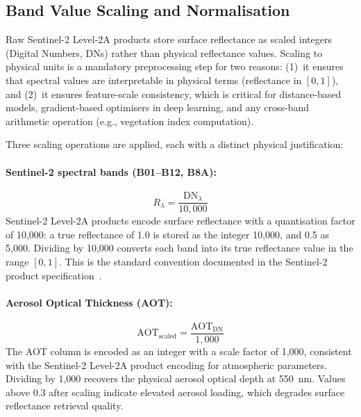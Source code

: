 \subsection{Band Value Scaling and Normalisation}
\label{subsec:scaling}

Raw Sentinel-2 Level-2A products store surface reflectance as scaled
integers (Digital Numbers, DNs) rather than physical reflectance values.
Scaling to physical units is a mandatory preprocessing step for two
reasons: (1)~it ensures that spectral values are interpretable in physical
terms (reflectance in $[0,1]$), and (2)~it ensures feature-scale
consistency, which is critical for distance-based models, gradient-based
optimisers in deep learning, and any cross-band arithmetic operation
(e.g., vegetation index computation).

Three scaling operations are applied, each with a distinct physical
justification:

\paragraph{Sentinel-2 spectral bands (B01--B12, B8A):}
\begin{equation}
\label{eq:band_scale}
R_{\lambda} = \frac{\mathrm{DN}_{\lambda}}{10{,}000}
\end{equation}
Sentinel-2 Level-2A products encode surface reflectance with a
quantisation factor of 10{,}000: a true reflectance of 1.0 is stored as
the integer 10{,}000, and 0.5 as 5{,}000. Dividing by 10{,}000 converts
each band into its true reflectance value in the range $[0,1]$. This is
the standard convention documented in the Sentinel-2 product
specification~\cite{esa2021s2}.

\paragraph{Aerosol Optical Thickness (AOT):}
\begin{equation}
\label{eq:aot_scale}
\mathrm{AOT}_{\text{scaled}} = \frac{\mathrm{AOT}_{\text{DN}}}{1{,}000}
\end{equation}
The AOT column is encoded as an integer with a scale factor of 1{,}000,
consistent with the Sentinel-2 Level-2A product encoding for atmospheric
parameters. Dividing by 1{,}000 recovers the physical aerosol optical
depth at 550~nm. Values above 0.3 after scaling indicate elevated aerosol
loading, which degrades surface reflectance retrieval quality.

